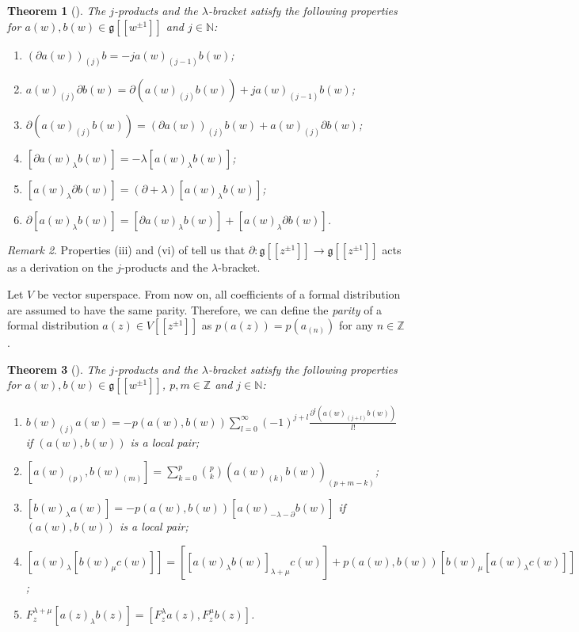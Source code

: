 \documentclass[a4paper, 12pt, reqno]{amsart}
\newtheorem{theorem}{Theorem}[section]
\theoremstyle{remark}
\newtheorem{remark}[theorem]{Remark}
\numberwithin{equation}{subsection}
\begin{document}
\begin{theorem}[{\cite[\S2.3]{nozaradan_introduction_2008}}]
  \label{thr:7}
  The $j$-products and the $\lambda$-bracket satisfy the following properties for $a(w), b(w) \in \mathfrak{g}[[w^{\pm 1}]]$ and $j \in \mathbb{N}$:
  \begin{enumerate}
  \item $(\partial a(w))_{(j)}b = -ja(w)_{(j - 1)}b(w)$;
  \item $a(w)_{(j)}\partial b(w) = \partial(a(w)_{(j)}b(w)) + ja(w)_{(j - 1)}b(w)$;
  \item $\partial(a(w)_{(j)}b(w)) = (\partial a(w))_{(j)}b(w) + a(w)_{(j)}\partial b(w)$;
  \item $[\partial a(w)_{\lambda}b(w)] = -\lambda[a(w)_{\lambda}b(w)]$;
  \item $[a(w)_{\lambda}\partial b(w)] = (\partial + \lambda)[a(w)_{\lambda}b(w)]$;
  \item $\partial[a(w)_{\lambda}b(w)] = [\partial a(w)_{\lambda}b(w)] + [a(w)_{\lambda}\partial b(w)]$.
  \end{enumerate}
\end{theorem}

\begin{remark}
  \label{rmk:5}
  Properties (iii) and (vi) of  tell us that $\partial: \mathfrak{g}[[z^{\pm 1}]] \to \mathfrak{g}[[z^{\pm 1}]]$ acts as a derivation on the $j$-products and the $\lambda$-bracket.
\end{remark}

Let $V$ be vector superspace.
From now on, all coefficients of a formal distribution are assumed to have the same parity.
Therefore, we can define the \emph{parity} of a formal distribution $a(z) \in V[[z^{\pm 1}]]$ as $p(a(z)) = p(a_{(n)})$ for any $n \in \mathbb{Z}$.

\begin{theorem}[{\cite[\S2.3]{nozaradan_introduction_2008}}]
  \label{thr:8}
  The $j$-products and the $\lambda$-bracket satisfy the following properties for $a(w), b(w) \in \mathfrak{g}[[w^{\pm 1}]]$, $p, m \in \mathbb{Z}$ and $j \in \mathbb{N}$:
  \begin{enumerate}
  \item $b(w)_{(j)}a(w) = -p(a(w), b(w))\sum_{l = 0}^{\infty}(-1)^{j + l}\frac{\partial^l(a(w)_{(j + l)}b(w))}{l!}$ if $(a(w), b(w))$ is a local pair;
  \item $[a(w)_{(p)}, b(w)_{(m)}] = \sum_{k = 0}^p\binom{p}{k}(a(w)_{(k)}b(w))_{(p + m - k)}$;
  \item $[b(w)_{\lambda}a(w)] = -p(a(w), b(w))[a(w)_{-\lambda - \partial}b(w)]$ if $(a(w), b(w))$ is a local pair;
  \item $[a(w)_{\lambda}[b(w)_{\mu}c(w)]] = [[a(w)_{\lambda}b(w)]_{\lambda + \mu}c(w)] + p(a(w), b(w))[b(w)_{\mu}[a(w)_{\lambda}c(w)]]$;
  \item $F^{\lambda + \mu}_z[a(z)_{\lambda}b(z)] = [F^{\lambda}_za(z), F^{\mu}_zb(z)]$.
  \end{enumerate}
\end{theorem}
\end{document}
